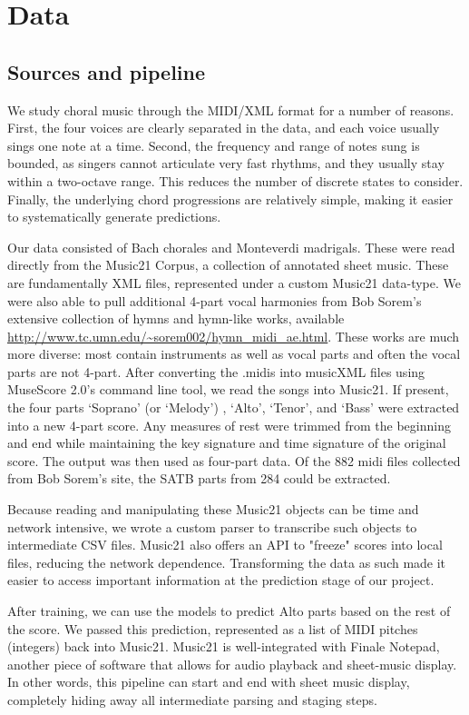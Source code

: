 \documentclass[11pt]{article}
\begin{document}
\section{Data}

\subsection{Sources and pipeline}
We study choral music through the MIDI/XML format for a number of reasons. First, the four voices are clearly separated in the data, and each voice usually sings one note at a time. Second, the frequency and range of notes sung is bounded, as singers cannot articulate very fast rhythms, and they usually stay within a two-octave range. This reduces the number of discrete states to consider. Finally, the underlying chord progressions are relatively simple, making it easier to systematically generate predictions.

Our data consisted of Bach chorales and Monteverdi madrigals. These were read directly from the Music21 Corpus, a collection of annotated sheet music. These are fundamentally XML files, represented under a custom Music21 data-type. We were also able to pull additional 4-part vocal harmonies from Bob Sorem's extensive collection of hymns and hymn-like works, available  \url{http://www.tc.umn.edu/~sorem002/hymn_midi_ae.html}. These works are much more diverse: most contain instruments as well as vocal parts and often the vocal parts are not 4-part. After converting the .midis into musicXML files using MuseScore 2.0's command line tool, we read the songs into Music21. If present, the four parts `Soprano' (or `Melody') , `Alto', `Tenor', and `Bass' were extracted into a new 4-part score. Any measures of rest were trimmed from the beginning and end while maintaining the key signature and time signature of the original score. The output was then used as four-part data. Of the 882 midi files collected from Bob Sorem's site, the SATB parts from 284 could be extracted. 

Because reading and manipulating these Music21 objects can be time and network intensive, we wrote a custom parser to transcribe such objects to intermediate CSV files. Music21 also offers an API to "freeze" scores into local files, reducing the network dependence. Transforming the data as such made it easier to access important information at the prediction stage of our project.

After training, we can use the models to predict Alto parts based on the rest of the score. We passed this prediction, represented as a list of MIDI pitches (integers) back into Music21. Music21 is well-integrated with Finale Notepad, another piece of software that allows for audio playback and sheet-music display. In other words, this pipeline can start and end with sheet music display, completely hiding away all intermediate parsing and staging steps.
\end{document}
